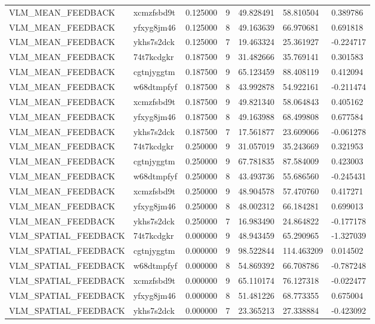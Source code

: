 \begin{tabular}{lllllll}
VLM\_MEAN\_FEEDBACK & xcmzfsbd9t & 0.125000 & 9 & 49.828491 & 58.810504 & 0.389786 \\
VLM\_MEAN\_FEEDBACK & yfxyg8jm46 & 0.125000 & 8 & 49.163639 & 66.970681 & 0.691818 \\
VLM\_MEAN\_FEEDBACK & ykhs7s2dck & 0.125000 & 7 & 19.463324 & 25.361927 & -0.224717 \\
VLM\_MEAN\_FEEDBACK & 74t7kcdgkr & 0.187500 & 9 & 31.482666 & 35.769141 & 0.301583 \\
VLM\_MEAN\_FEEDBACK & cgtnjyggtm & 0.187500 & 9 & 65.123459 & 88.408119 & 0.412094 \\
VLM\_MEAN\_FEEDBACK & w68dtmpfyf & 0.187500 & 8 & 43.992878 & 54.922161 & -0.211474 \\
VLM\_MEAN\_FEEDBACK & xcmzfsbd9t & 0.187500 & 9 & 49.821340 & 58.064843 & 0.405162 \\
VLM\_MEAN\_FEEDBACK & yfxyg8jm46 & 0.187500 & 8 & 49.163988 & 68.499808 & 0.677584 \\
VLM\_MEAN\_FEEDBACK & ykhs7s2dck & 0.187500 & 7 & 17.561877 & 23.609066 & -0.061278 \\
VLM\_MEAN\_FEEDBACK & 74t7kcdgkr & 0.250000 & 9 & 31.057019 & 35.243669 & 0.321953 \\
VLM\_MEAN\_FEEDBACK & cgtnjyggtm & 0.250000 & 9 & 67.781835 & 87.584009 & 0.423003 \\
VLM\_MEAN\_FEEDBACK & w68dtmpfyf & 0.250000 & 8 & 43.493736 & 55.686560 & -0.245431 \\
VLM\_MEAN\_FEEDBACK & xcmzfsbd9t & 0.250000 & 9 & 48.904578 & 57.470760 & 0.417271 \\
VLM\_MEAN\_FEEDBACK & yfxyg8jm46 & 0.250000 & 8 & 48.002312 & 66.184281 & 0.699013 \\
VLM\_MEAN\_FEEDBACK & ykhs7s2dck & 0.250000 & 7 & 16.983490 & 24.864822 & -0.177178 \\
VLM\_SPATIAL\_FEEDBACK & 74t7kcdgkr & 0.000000 & 9 & 48.943459 & 65.290965 & -1.327039 \\
VLM\_SPATIAL\_FEEDBACK & cgtnjyggtm & 0.000000 & 9 & 98.522844 & 114.463209 & 0.014502 \\
VLM\_SPATIAL\_FEEDBACK & w68dtmpfyf & 0.000000 & 8 & 54.869392 & 66.708786 & -0.787248 \\
VLM\_SPATIAL\_FEEDBACK & xcmzfsbd9t & 0.000000 & 9 & 65.110174 & 76.127318 & -0.022477 \\
VLM\_SPATIAL\_FEEDBACK & yfxyg8jm46 & 0.000000 & 8 & 51.481226 & 68.773355 & 0.675004 \\
VLM\_SPATIAL\_FEEDBACK & ykhs7s2dck & 0.000000 & 7 & 23.365213 & 27.338884 & -0.423092 \\

\end{tabular}

